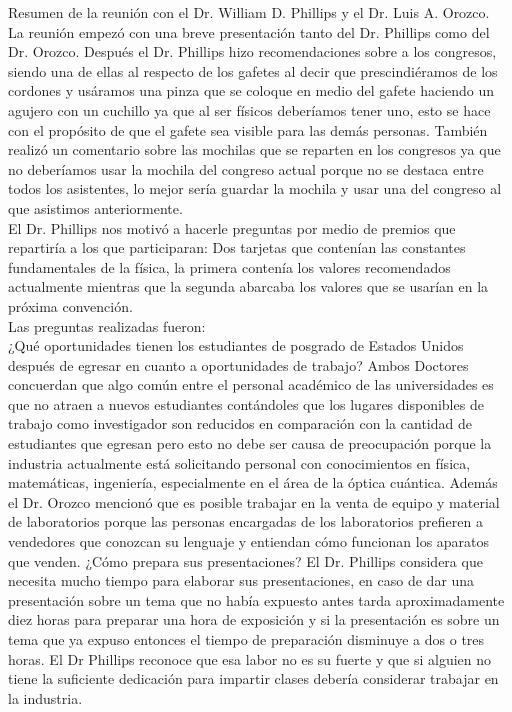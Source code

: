 \documentclass[10pt,letterpaper]{report}
\begin{document}
Resumen de la reunión con el Dr. William D. Phillips y el Dr. Luis A. Orozco.
\\
La reunión empezó con una breve presentación tanto del Dr. Phillips como del Dr. Orozco. Después el Dr. Phillips hizo recomendaciones sobre a los congresos, siendo una de ellas al respecto de los gafetes al decir que prescindiéramos de los cordones y usáramos una pinza que se coloque en medio del gafete haciendo un agujero con un cuchillo ya que al ser físicos deberíamos tener uno, esto se hace con el propósito de que el gafete sea visible para las demás personas. También realizó un comentario sobre las mochilas que se reparten en los congresos ya que no deberíamos usar la mochila del congreso actual porque no se destaca entre todos los asistentes, lo mejor sería guardar la mochila y usar una del congreso al que asistimos anteriormente.
\\
El Dr. Phillips nos motivó a hacerle preguntas por medio de premios que repartiría a los que participaran: Dos tarjetas que contenían las constantes fundamentales de la física, la primera contenía los valores recomendados actualmente mientras que la segunda abarcaba los valores que se usarían en la próxima convención.
\\
Las preguntas realizadas fueron:
\\
¿Qué oportunidades tienen los estudiantes de posgrado de Estados Unidos después de egresar en cuanto a oportunidades de trabajo?
Ambos Doctores concuerdan que algo común entre el personal académico de las universidades es que no atraen a nuevos estudiantes contándoles que los lugares disponibles de trabajo como investigador son reducidos en comparación con la cantidad de estudiantes que egresan pero esto no debe ser causa de preocupación porque la industria actualmente está solicitando personal con conocimientos en física, matemáticas, ingeniería, especialmente en el área de la óptica cuántica. Además el Dr. Orozco mencionó que es posible trabajar en la venta de equipo y material de laboratorios porque las personas encargadas de los laboratorios prefieren a vendedores que conozcan su lenguaje y entiendan cómo funcionan los aparatos que venden.
¿Cómo prepara sus presentaciones?
El Dr. Phillips considera que necesita mucho tiempo para elaborar sus presentaciones, en caso de dar una presentación sobre un tema que no había expuesto antes tarda aproximadamente diez horas para preparar una hora de exposición y si la presentación es sobre un tema que ya expuso entonces el tiempo de preparación disminuye a dos o tres horas. El Dr Phillips reconoce que esa labor no es su fuerte y que si alguien no tiene la suficiente dedicación para impartir clases debería considerar trabajar en la industria.
\end{document}
